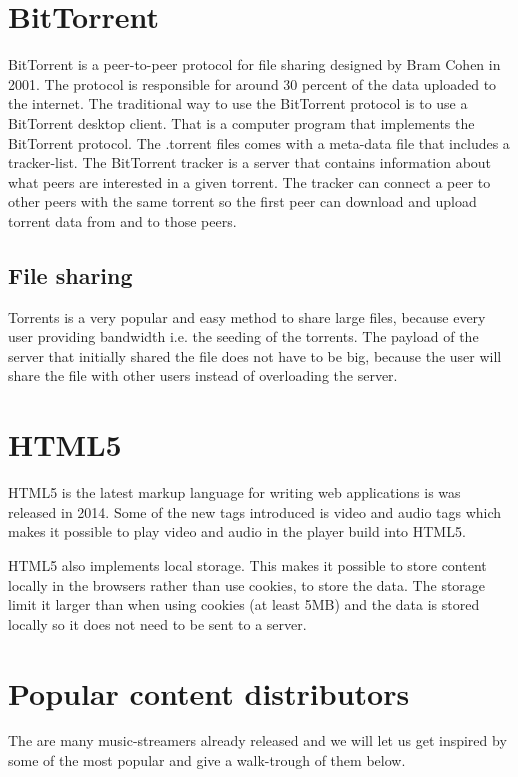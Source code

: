 \section{BitTorrent}
BitTorrent \citep{bittorrent:bep03} is a peer-to-peer protocol for file sharing designed by Bram Cohen in 2001.
The protocol is responsible for around 30 percent of the data uploaded to the internet.
The traditional way to use the BitTorrent protocol is to use a BitTorrent desktop client. That is a computer program that implements the BitTorrent protocol.
The .torrent files comes with a meta-data file that includes a tracker-list. The BitTorrent tracker is a server that contains information about what peers are interested in a given torrent. The tracker can connect a peer to other peers with the same torrent so the first peer can download and upload torrent data from and to those peers.

\subsection{File sharing}
Torrents is a very popular and easy method to share large files, because every user providing bandwidth i.e. the seeding of the torrents.
The payload of the server that initially shared the file does not have to be big, because the user will share the file with other users instead of overloading the server.

\section{HTML5}
HTML5 is the latest markup language for writing web applications is was released in 2014. Some of the new tags introduced is video and audio tags which makes it possible to play video and audio in the player build into HTML5.

HTML5 also implements local storage. This makes it possible to store content locally in the browsers rather than use cookies, to store the data.
The storage limit it larger than when using cookies (at least 5MB) and the data is stored locally so it does not need to be sent to a server.

\section{Popular content distributors}
The are many music-streamers already released and we will let us get inspired by some of the most popular and give a walk-trough of them below.

